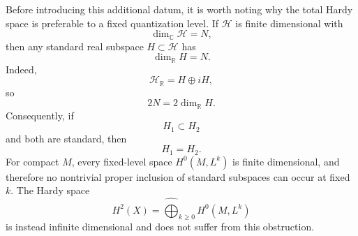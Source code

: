 \documentclass[a4paper,11pt]{article}
\theoremstyle{definition}
\newcommand{\cH}{\mathcal{H}}
\begin{document}
Before introducing this additional datum, it is worth noting why the total
Hardy space is preferable to a fixed quantization level.  If $\cH$ is finite
dimensional with
\begin{equation}
    \dim_{\mathbb C}\cH=N,
\end{equation}
then any standard real subspace $H\subset\cH$ has
\begin{equation}
    \dim_{\mathbb R}H=N.
\end{equation}
Indeed,
\begin{equation}
    \cH_{\mathbb R}
    =
    H\oplus iH,
\end{equation}
so
\begin{equation}
    2N
    =
    2\dim_{\mathbb R}H.
\end{equation}
Consequently, if
\begin{equation}
    H_1\subset H_2
\end{equation}
and both are standard, then
\begin{equation}
    H_1=H_2.
\end{equation}
For compact $M$, every fixed-level space $H^0(M,L^k)$ is finite dimensional,
and therefore no nontrivial proper inclusion of standard subspaces can occur
at fixed $k$.  The Hardy space
\begin{equation}
    H^2(X)
    =
    \widehat{\bigoplus}_{k\geq0}H^0(M,L^k)
\end{equation}
is instead infinite dimensional and does not suffer from this obstruction.
\end{document}
